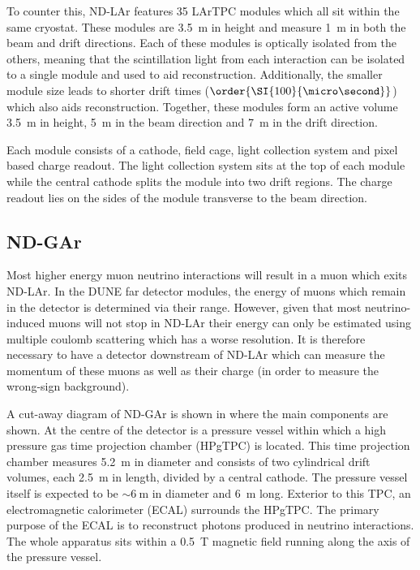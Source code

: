 To counter this, ND-LAr features 35 LArTPC modules which all sit within the same cryostat.
These modules are \SI{3.5}{\metre} in height and measure \SI{1}{\metre} in both the beam and drift directions.
Each of these modules is optically isolated from the others, meaning that the scintillation light from each interaction can be isolated to a single module and used to aid reconstruction.
Additionally, the smaller module size leads to shorter drift times ($\order{\SI{100}{\micro\second}}$) which also aids reconstruction.
Together, these modules form an active volume \SI{3.5}{\metre} in height, \SI{5}{\metre} in the beam direction and \SI{7}{\metre} in the drift direction.

Each module consists of a cathode, field cage, light collection system and pixel based charge readout.
The light collection system sits at the top of each module while the central cathode splits the module into two drift regions.
The charge readout lies on the sides of the module transverse to the beam direction.

\subsection{ND-GAr}
\label{sec:dune:nd:gar}

Most higher energy muon neutrino interactions will result in a muon which exits ND-LAr.
In the DUNE far detector modules, the energy of muons which remain in the detector is determined via their range.
However, given that most neutrino-induced muons will not stop in ND-LAr their energy can only be estimated using multiple coulomb scattering which has a worse resolution.
It is therefore necessary to have a detector downstream of ND-LAr which can measure the momentum of these muons as well as their charge (in order to measure the wrong-sign background).

A cut-away diagram of ND-GAr is shown in  where the main components are shown.
At the centre of the detector is a pressure vessel within which a high pressure gas time projection chamber (HPgTPC) is located.
This time projection chamber measures \SI{5.2}{\metre} in diameter and consists of two cylindrical drift volumes, each \SI{2.5}{\metre} in length, divided by a central cathode.
The pressure vessel itself is expected to be $\sim\SI{6}{\metre}$ in diameter and \SI{6}{\metre} long. 
Exterior to this TPC, an electromagnetic calorimeter (ECAL) surrounds the HPgTPC.
The primary purpose of the ECAL is to reconstruct photons produced in neutrino interactions.
The whole apparatus sits within a \SI{0.5}{\tesla} magnetic field running along the axis of the pressure vessel.

